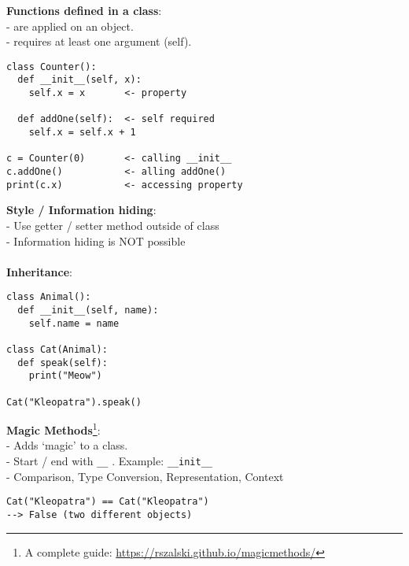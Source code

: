 \documentclass{beamer}
\begin{document}
\begin{frame}[fragile]
    \textbf{Functions defined in a class}:\\
    - are applied on an object.\\
    - requires at least one argument (self).

    \begin{example}
        \begin{verbatim}
class Counter():
  def __init__(self, x):
    self.x = x       <- property

  def addOne(self):  <- self required
    self.x = self.x + 1

c = Counter(0)       <- calling __init__
c.addOne()           <- alling addOne()
print(c.x)           <- accessing property
        \end{verbatim}
    \end{example}
\end{frame}


\begin{frame}[fragile]
    \textbf{Style / Information hiding}:\\
    - Use getter / setter method outside of class\\
    - Information hiding is NOT possible\\\\
    \textbf{Inheritance}:
    \begin{example}
        \begin{verbatim}
class Animal():
  def __init__(self, name):
    self.name = name

class Cat(Animal):
  def speak(self):
    print("Meow")

Cat("Kleopatra").speak()
        \end{verbatim}
    \end{example}
\end{frame}

\begin{frame}[fragile]
    \textbf{Magic Methods}\footnote{A complete guide: \url{https://rszalski.github.io/magicmethods/}}:\\
    - Adds `magic' to a class.\\
    - Start / end with \texttt{__} . Example: \texttt{__init__}\\
    - Comparison, Type Conversion, Representation, Context

    \begin{example}
        \begin{verbatim}
Cat("Kleopatra") == Cat("Kleopatra")
--> False (two different objects)
        \end{verbatim}
    \end{example}
\end{frame}
\end{document}
